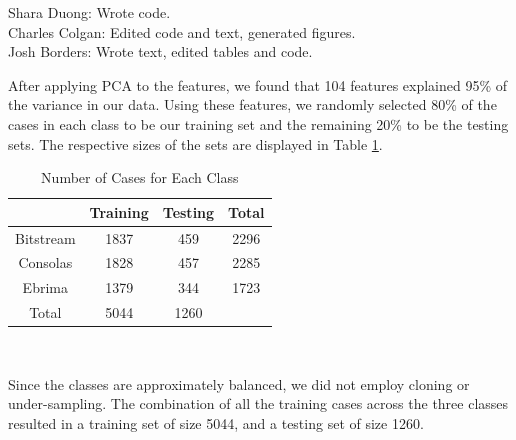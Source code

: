 \documentclass{homework}
\begin{document}
\maketitle
Shara Duong: Wrote code.\\
Charles Colgan: Edited code and text, generated figures.\\
Josh Borders: Wrote text, edited tables and code.

\question %
After applying PCA to the features, we found that 104 features explained 95\% of the variance in our data. Using these features, we randomly selected 80\% of the cases in each class to be our training set and the remaining 20\% to be the testing sets. The respective sizes of the sets are displayed in Table \ref{sampling}.

\begin{table}[h]
    \centering
    {\begin{tabular}{c|ccc}
         &Training&Testing&Total\\\hline
         Bitstream&1837&459&2296\\
         Consolas&1828&457&2285\\
         Ebrima&1379&344&1723\\\hline
         Total&5044&1260
    \end{tabular}}\\
    \caption{Number of Cases for Each Class}
    \label{sampling}
\end{table}

Since the classes are approximately balanced, we did not employ cloning or under-sampling. The combination of all the training cases across the three classes resulted in a training set of size 5044, and a testing set of size 1260.

\question %
\end{document}
